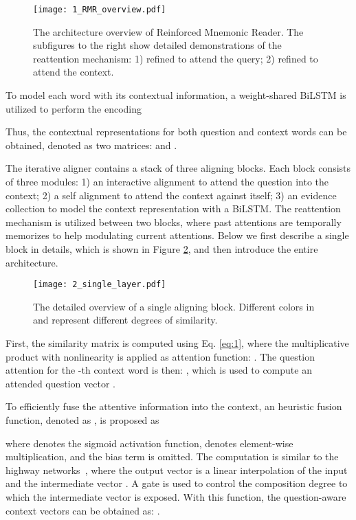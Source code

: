 \documentclass{article}
\begin{document}
\begin{figure}
\begin{center}
\texttt{[image: 1\_RMR\_overview.pdf]}
\end{center}
\caption{The architecture overview of Reinforced Mnemonic Reader. The subfigures to the right show detailed demonstrations of the reattention mechanism: 1) refined  to attend the query; 2) refined  to attend the context.}
\label{fig1}
\end{figure}
To model each word with its contextual information, a weight-shared BiLSTM is utilized to perform the encoding

Thus, the contextual representations for both question and context words can be obtained, denoted as two matrices:  and .

The iterative aligner contains a stack of three aligning blocks. 
Each block consists of three modules:
1) an interactive alignment to attend the question into the context;
2) a self alignment to attend the context against itself;
3) an evidence collection to model the context representation with a BiLSTM.
The reattention mechanism is utilized between two blocks, where past attentions are temporally memorizes to help modulating current attentions.
Below we first describe a single block in details, which is shown in Figure \ref{fig2}, and then introduce the entire architecture.

\begin{figure}
\begin{center}
\texttt{[image: 2\_single\_layer.pdf]}
\end{center}
\caption{The detailed overview of a single aligning block. Different colors in  and  represent different degrees of similarity.}
\label{fig2}
\end{figure}

First, the similarity matrix  is computed using Eq. \ref{eq:1}, where the multiplicative product with nonlinearity is applied as attention function: .
The question attention for the -th context word is then: , which is used to compute an attended question vector .

To efficiently fuse the attentive information into the context, an heuristic fusion function, denoted as , is proposed as

where  denotes the sigmoid activation function,  denotes element-wise multiplication, and the bias term is omitted. 
The computation is similar to the highway networks~\cite{Srivastava15}, where the output vector  is a linear interpolation of the input  and the intermediate vector . A gate  is used to control the composition degree to which the intermediate vector is exposed.
With this function, the question-aware context vectors  can be obtained as: .
\end{document}

